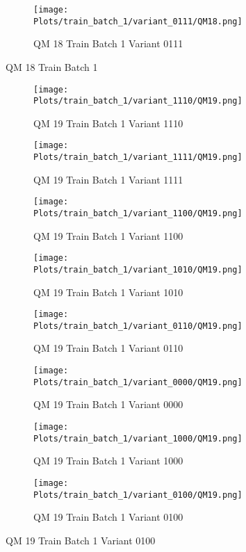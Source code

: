 \documentclass{DissertateFigs}
\begin{document}
\begin{figure}[t!]
\medskip

    \begin{subfigure}{0.47\textwidth}
    \texttt{[image: Plots/train\_batch\_1/variant\_0111/QM18.png]}
    \caption{QM 18 Train Batch 1 Variant 0111}
    \end{subfigure}
\caption{QM 18 Train Batch 1}
    \end{figure}
\clearpage
\begin{figure}[t!]
    \begin{subfigure}{0.47\textwidth}
    \texttt{[image: Plots/train\_batch\_1/variant\_1110/QM19.png]}
    \caption{QM 19 Train Batch 1 Variant 1110}
    \end{subfigure}
    \begin{subfigure}{0.47\textwidth}
    \texttt{[image: Plots/train\_batch\_1/variant\_1111/QM19.png]}
    \caption{QM 19 Train Batch 1 Variant 1111}
    \end{subfigure}

\medskip

    \begin{subfigure}{0.47\textwidth}
    \texttt{[image: Plots/train\_batch\_1/variant\_1100/QM19.png]}
    \caption{QM 19 Train Batch 1 Variant 1100}
    \end{subfigure}
    \begin{subfigure}{0.47\textwidth}
    \texttt{[image: Plots/train\_batch\_1/variant\_1010/QM19.png]}
    \caption{QM 19 Train Batch 1 Variant 1010}
    \end{subfigure}

\medskip

    \begin{subfigure}{0.47\textwidth}
    \texttt{[image: Plots/train\_batch\_1/variant\_0110/QM19.png]}
    \caption{QM 19 Train Batch 1 Variant 0110}
    \end{subfigure}
    \begin{subfigure}{0.47\textwidth}
    \texttt{[image: Plots/train\_batch\_1/variant\_0000/QM19.png]}
    \caption{QM 19 Train Batch 1 Variant 0000}
    \end{subfigure}

\medskip

    \begin{subfigure}{0.47\textwidth}
    \texttt{[image: Plots/train\_batch\_1/variant\_1000/QM19.png]}
    \caption{QM 19 Train Batch 1 Variant 1000}
    \end{subfigure}
    \begin{subfigure}{0.47\textwidth}
    \texttt{[image: Plots/train\_batch\_1/variant\_0100/QM19.png]}
    \caption{QM 19 Train Batch 1 Variant 0100}
    \end{subfigure}


\end{figure}
\end{document}
